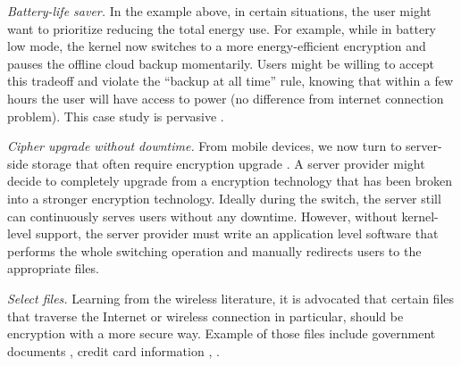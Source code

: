 {\em Battery-life saver.} In the example above, in certain situations, the user
might want to prioritize reducing the total energy use. For example, while in
battery low mode, the kernel now switches to a more energy-efficient encryption
and pauses the offline cloud backup momentarily. Users might be willing to
accept this tradeoff and violate the ``backup at all time'' rule, knowing that
within a few hours the user will have access to power (no difference from
internet connection problem). This case study is pervasive \cite{hackernews-???,
many-more??}.

{\em Cipher upgrade without downtime.} From mobile devices, we now turn to
server-side storage that often require encryption upgrade \cite{some-citations}.
A server provider might decide to completely upgrade from a encryption
technology that has been broken into a stronger encryption technology. Ideally
during the switch, the server still can continuously serves users without any
downtime. However, without kernel-level support, the server provider must write
an application level software that performs the whole switching operation and
manually redirects users to the appropriate files.

{\em Select files.} Learning from the wireless literature, it is advocated that
certain files that traverse the Internet or wireless connection in particular,
should be encryption with a more secure way. Example of those files include
government documents \cite{citation-to-this-example}, credit card information
\cite{a}, \xxx \cite{a, b, c}.
